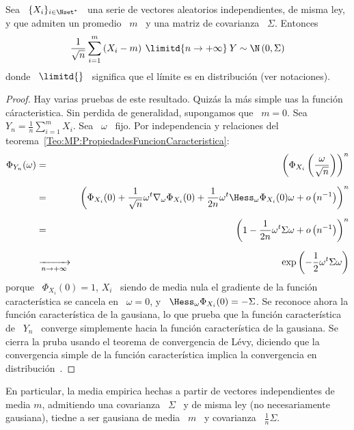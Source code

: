 \begin{teorema}\label{Teo:MP:CLT}
%
  Sea  \  $\{  X_i \}_{i  \in  \Nset^*}$  \  una  serie de  vectores  aleatorios
  independientes, de misma ley,  y que admiten un promedio \ $m$  \ y una matriz
  de covarianza \ $\Sigma$. Entonces
  \[
  \frac{1}{\sqrt{n}}  \sum_{i=1}^m  \left( X_i  -  m  \right)  \: \limitd{n  \to
    +\infty} \: Y \sim \N\left( 0 , \Sigma \right)
  \]
  donde  \ $\limitd{}$ \  significa que  el l\'imite  es en  distribuci\'on (ver
  notaciones).
\end{teorema}
\begin{proof}
  Hay  varias  pruebas de  este  resultado.  Quiz\'as  la  m\'as  simple uas  la
  funci\'on c\'aracteristica.  Sin perdida de generalidad, supongamos que \ $m =
  0$. Sea \ $\displaystyle Y_n  = \frac{1}{n} \sum_{i=1}^m X_i$.  Sea \ $\omega$
  \       fijo.       Por       independencia       y       relaciones       del
  teorema~\ref{Teo:MP:PropiedadesFuncionCaracteristica}:
  \begin{eqnarray*}
  \Phi_{Y_n}(\omega) & = & \left( \Phi_{X_i}\left( \frac{\omega}{\sqrt{n}}
  \right) \right)^n\\[2mm]
  & = & \left( \Phi_{X_i}(0) + \frac{1}{\sqrt{n}} \omega^t \nabla_\omega
  \Phi_{X_i}(0) + \frac{1}{2 n} \omega^t \Hess_\omega\Phi_{X_i}(0) \omega +
  o\left( n^{-1} \right) \right)^n\\[2mm]
  & = & \left( 1 - \frac{1}{2 n} \omega^t \Sigma \omega +
  o\left( n^{-1} \right) \right)^n\\[2mm]
  & \xrightarrow[n \to +\infty]{} & \exp\left( -\frac12 \omega^t \Sigma \omega \right)
  \end{eqnarray*}
  porque \ $\Phi_{X_i}(0) = 1$, $X_i$ \  siendo de media nula el gradiente de la
  funci\'on   caracter\'istica   se  cancela   en   \   $\omega   =  0$,   y   \
  $\Hess_\omega\Phi_{X_i}(0)  =  -  \Sigma$.   Se reconoce  ahora  la  funci\'on
  caracter\'istica   de  la   gausiana,   lo  que   prueba   que  la   funci\'on
  caracter\'istica  de  \  $Y_n$  \  converge  simplemente  hacia  la  funci\'on
  caracter\'istica  de la gausiana.   Se cierra  la pruba  usando el  teorema de
  convergencia de  L\'evy, diciendo que  la convergencia simple de  la funci\'on
  caracter\'istica  implica  la  convergencia en  distribuci\'on~\cite{AshDol99,
    Bil12, AthLah06}.
\end{proof}
%
En particular, la  media empirica hechas a partir  de vectores independientes de
media  $m$,  admitiendo  una  covarianza  \  $\Sigma$  \  y  de  misma  ley  (no
necesariamente gausiana), tiedne a ser gausiana  de media \ $m$ \ y covarianza \
$\frac{1}{n} \Sigma$.

